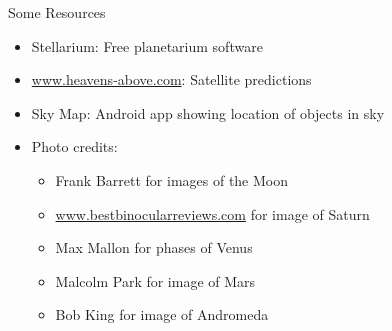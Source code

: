 \documentclass[pdf, ]{beamer}
\begin{document}
\begin{frame}{Some Resources}
	\begin{itemize}
		\item Stellarium: Free planetarium software
		\item \url{www.heavens-above.com}: Satellite predictions
		\item Sky Map: Android app showing location of objects in sky
	\end{itemize}
	\vspace{5mm}
	\begin{itemize}
		\item Photo credits:
			\begin{itemize}
				\item Frank Barrett for images of the Moon
				\item \url{www.bestbinocularreviews.com} for image of Saturn
				\item Max Mallon for phases of Venus
				\item Malcolm Park for image of Mars
				\item Bob King for image of Andromeda
			\end{itemize}
			
	\end{itemize}
	
	
\end{frame}
\end{document}
